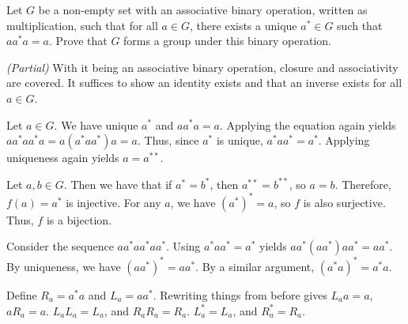 \documentclass[12pt]{article}
\begin{document}
\begin{question}
    Let $G$ be a non-empty set with an associative binary operation,
    written as multiplication, such that 
    for all $a \in G$, there exists a unique $a^{*} \in G$ such that $aa^{*}a = a$.
    Prove that $G$ forms a group under this binary operation.
\end{question}
\begin{nonproof} \textit{(Partial)}
    With it being an associative binary operation, 
    closure and associativity are covered.
    It suffices to show an identity exists and that
    an inverse exists for all $a \in G$.

    Let $a \in G$.
    We have unique $a^{*}$ and $aa^{*}a = a$.
    Applying the equation again yields $aa^{*}aa^{*}a = a(a^{*}aa^{*})a = a$.
    Thus, since $a^{*}$ is unique, $a^{*}aa^{*} = a^{*}$.
    Applying uniqueness again yields $a = a^{**}$.

    Let $a,b \in G$. Then we have that if $a^{*} = b^{*}$,
    then $a^{**} = b^{**}$, so $a = b$.
    Therefore, $f(a) = a^{*}$ is injective.
    For any $a$, we have $(a^{*})^{*} = a$, so $f$ is also surjective.
    Thus, $f$ is a bijection.

    Consider the sequence $aa^{*}aa^{*}aa^{*}$.
    Using $a^{*}aa^{*} = a^{*}$ yields $aa^{*}(aa^{*})aa^{*} = aa^{*}$.
    By uniqueness, we have $(aa^{*})^{*} = aa^{*}$.
    By a similar argument, $(a^{*}a)^{*} = a^{*}a$.

    Define $R_{a} = a^{*}a$ and $L_{a} = aa^{*}$.
    Rewriting things from before gives
    $L_{a}a = a$, $aR_{a} = a$.
    $L_a L_a = L_a$, and $R_a R_a = R_a$.
    $L_a^{*} = L_a$, and $R_a^{*} = R_a$.
\end{nonproof}
\end{document}
